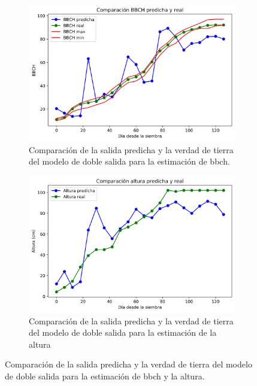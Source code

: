 \begin{figure}[H]
\centering
\begin{subfigure}{.65\textwidth}
  \centering
  \includegraphics[width=0.95\linewidth]{archivos/tfg/Mean/TEST_PARC_FINAL_BH}
  \caption{Comparación de la salida predicha y la verdad de tierra del modelo de doble salida para la estimación de \gls{bbch}. \label{fig:sub_c1}}
\end{subfigure}
\begin{subfigure}{.65\textwidth}
  \centering
  \includegraphics[width=0.95\linewidth]{archivos/tfg/Mean/TEST_PARC_FINAL_BH_H}
  \caption{Comparación de la salida predicha y la verdad de tierra del modelo de doble salida para la estimación de la altura\label{fig:sub_c2}}
\end{subfigure}
\caption{Comparación de la salida predicha y la verdad de tierra del modelo de doble salida para la estimación de \gls{bbch} y la altura. \label{fig:comp_bh}}
\end{figure}

